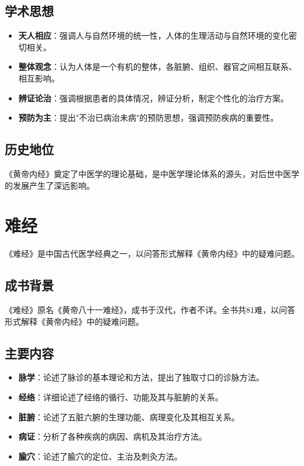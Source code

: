 \documentclass[12pt,UTF8]{ctexbook}
\begin{document}
\subsection{学术思想}

\begin{itemize}
\item \textbf{天人相应}：强调人与自然环境的统一性，人体的生理活动与自然环境的变化密切相关。
\item \textbf{整体观念}：认为人体是一个有机的整体，各脏腑、组织、器官之间相互联系、相互影响。
\item \textbf{辨证论治}：强调根据患者的具体情况，辨证分析，制定个性化的治疗方案。
\item \textbf{预防为主}：提出"不治已病治未病"的预防思想，强调预防疾病的重要性。
\end{itemize}

\subsection{历史地位}

《黄帝内经》奠定了中医学的理论基础，是中医学理论体系的源头，对后世中医学的发展产生了深远影响。

\section{难经}

《难经》是中国古代医学经典之一，以问答形式解释《黄帝内经》中的疑难问题。

\subsection{成书背景}

《难经》原名《黄帝八十一难经》，成书于汉代，作者不详。全书共81难，以问答形式解释《黄帝内经》中的疑难问题。

\subsection{主要内容}

\begin{itemize}
\item \textbf{脉学}：论述了脉诊的基本理论和方法，提出了独取寸口的诊脉方法。
\item \textbf{经络}：详细论述了经络的循行、功能及其与脏腑的关系。
\item \textbf{脏腑}：论述了五脏六腑的生理功能、病理变化及其相互关系。
\item \textbf{病证}：分析了各种疾病的病因、病机及其治疗方法。
\item \textbf{腧穴}：论述了腧穴的定位、主治及刺灸方法。
\end{itemize}
\end{document}
